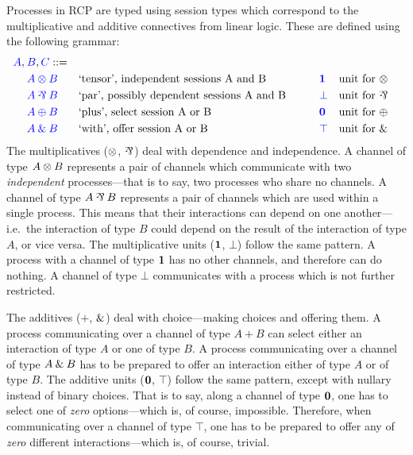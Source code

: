 \documentclass[a4paper,UKenglish]{lipics-v2016}
\begin{document}
Processes in RCP are typed using session types which correspond to the
multiplicative and additive connectives from linear logic. These are defined
using the following grammar:
\[
  \begin{aligned}
    \blue{A},\:&\blue{B},\blue{C} ::=\\
    &       \tm{A \tens B} &&\text{`tensor', independent sessions A and B}
    &\qquad&\tm{\one}      &&\text{unit for \tens}\\
    &       \tm{A \parr B} &&\text{`par', possibly dependent sessions A and B}
    &\qquad&\tm{\bot}      &&\text{unit for \parr}\\
    &       \tm{A \plus B} &&\text{`plus', select session A or B}
    &\qquad&\tm{\nil}      &&\text{unit for \plus}\\
    &       \tm{A \with B} &&\text{`with', offer session A or B}
    &\qquad&\tm{\top}      &&\text{unit for \with}
  \end{aligned}
\]
The multiplicatives ($\otimes$, $\parr$) deal with dependence and independence.
A channel of type $A \otimes B$ represents a pair of channels which communicate
with two \emph{independent} processes---that is to say, two processes who share
no channels.
A channel of type $A \parr B$ represents a pair of channels which are used
within a single process. This means that their interactions can depend on one
another---i.e.\ the interaction of type $B$ could depend on the result of the
interaction of type $A$, or vice versa.
The multiplicative units ($\mathbf{1}$, $\bot$) follow the same pattern.
A process with a channel of type $\mathbf{1}$ has no other channels, and therefore can
do nothing. 
A channel of type $\bot$ communicates with a process which is not further
restricted.

The additives ($\plus$, $\mathbin{\text{\&}}$) deal with choice---making choices and offering
them.
A process communicating over a channel of type $A \plus B$ can select either an
interaction of type $A$ or one of type $B$.
A process communicating over a channel of type $A \mathbin{\text{\&}} B$ has to be prepared to
offer an interaction either of type $A$ or of type $B$.
The additive units ($\mathbf{0}$, $\top$) follow the same pattern, except with nullary
instead of binary choices. That is to say, along a channel of type $\mathbf{0}$, one
has to select one of \emph{zero} options---which is, of course, impossible.
Therefore, when communicating over a channel of type $\top$, one has to be
prepared to offer any of \emph{zero} different interactions---which is, of
course, trivial.
\end{document}
